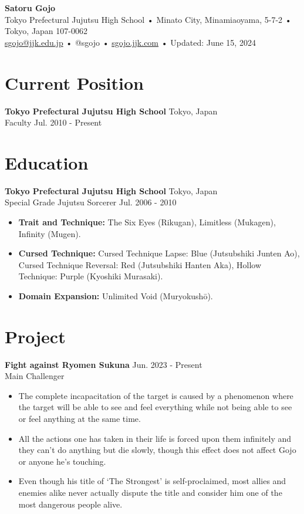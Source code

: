 \documentclass[a4paper,10pt]{article}
\begin{document}
\begin{center}
    \textbf{\LARGE Satoru Gojo} \\
    \vspace{0.2cm}
    Tokyo Prefectural Jujutsu High School • Minato City, Minamiaoyama, 5-7-2 • Tokyo, Japan 107-0062 \\
    \href{mailto:sgojo@jjk.edu.jp}{sgojo@jjk.edu.jp} • @sgojo • \href{http://sgojo.jjk.com}{sgojo.jjk.com} • Updated: June 15, 2024
\end{center}

\vspace{0.5cm}

\section*{Current Position}
\textbf{Tokyo Prefectural Jujutsu High School} \hfill Tokyo, Japan \\
Faculty \hfill Jul. 2010 - Present

\vspace{0.5cm}

\section*{Education}
\textbf{Tokyo Prefectural Jujutsu High School} \hfill Tokyo, Japan \\
Special Grade Jujutsu Sorcerer \hfill Jul. 2006 - 2010 \\
\begin{itemize}
    \item \textbf{Trait and Technique:} The Six Eyes (Rikugan), Limitless (Mukagen), Infinity (Mugen).
    \item \textbf{Cursed Technique:} Cursed Technique Lapse: Blue (Jutsubshiki Junten Ao), Cursed Technique Reversal: Red (Jutsubshiki Hanten Aka), Hollow Technique: Purple (Kyoshiki Murasaki).
    \item \textbf{Domain Expansion:} Unlimited Void (Muryokushō).
\end{itemize}

\vspace{0.5cm}

\section*{Project}
\textbf{Fight against Ryomen Sukuna} \hfill Jun. 2023 - Present \\
Main Challenger
\begin{itemize}
    \item The complete incapacitation of the target is caused by a phenomenon where the target will be able to see and feel everything while not being able to see or feel anything at the same time.
    \item All the actions one has taken in their life is forced upon them infinitely and they can’t do anything but die slowly, though this effect does not affect Gojo or anyone he’s touching.
    \item Even though his title of ‘The Strongest’ is self-proclaimed, most allies and enemies alike never actually dispute the title and consider him one of the most dangerous people alive.
\end{itemize}
\end{document}
